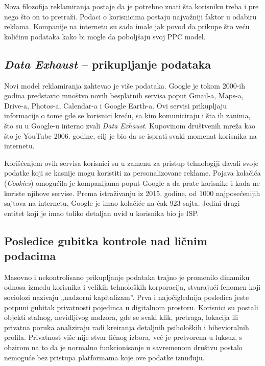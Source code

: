 \documentclass[12pt,a4paper]{article}
\begin{document}
Nova filozofija reklamiranja postaje da je potrebno znati šta korisniku treba i pre nego što on to pretraži. Podaci o korisnicima postaju najvažniji faktor u odabiru reklama. Kompanije na internetu su sada imale jak povod da prikupe što veću količinu podataka kako bi mogle da poboljšaju svoj PPC model.

\subsection{\textbf{\textit{Data Exhaust} – prikupljanje podataka}}

Novi model reklamiranja zahtevao je više podataka. Google je tokom 2000-ih godina predstavio mnoštvo novih besplatnih servisa poput Gmail-a, Maps-a, Drive-a, Photos-a, Calendar-a i Google Earth-a. Ovi servisi prikupljaju informacije o tome gde se korisnici kreću, sa kim komuniciraju i šta ih zanima, što su u Google-u interno zvali \textit{Data Exhaust}. Kupovinom društvenih mreža kao što je YouTube 2006. godine, cilj je bio da se isprati svaki momenat korisnika na internetu.

Korišćenjem ovih servisa korisnici su u zamenu za pristup tehnologiji davali svoje podatke koji se kasnije mogu koristiti za personalizovane reklame. Pojava kolačića (\textit{Cookies}) omogućila je kompanijama poput Google-a da prate korisnike i kada ne koriste njihove servise. Prema istraživanju iz 2015. godine, od 1000 najposećenijih sajtova na internetu, Google je imao kolačiće na čak 923 sajta. Jedini drugi entitet koji je imao toliko detaljan uvid u korisnika bio je ISP.

\newpage

\subsection{\textbf{Posledice gubitka kontrole nad ličnim podacima}}

Masovno i nekontrolisano prikupljanje podataka trajno je promenilo dinamiku odnosa između korisnika i velikih tehnoloških korporacija, stvarajući fenomen koji sociolozi nazivaju „nadzorni kapitalizam”. Prva i najočiglednija posledica jeste potpuni gubitak privatnosti pojedinca u digitalnom prostoru. Korisnici su postali objekti stalnog, nevidljivog nadzora, gde se svaki klik, pretraga, lokacija ili privatna poruka analiziraju radi kreiranja detaljnih psiholoških i bihevioralnih profila. Privatnost više nije stvar ličnog izbora, već je pretvorena u luksuz, s obzirom na to da je normalno funkcionisanje u savremenom društvu postalo nemoguće bez pristupa platformama koje ove podatke iznuđuju.
\end{document}
